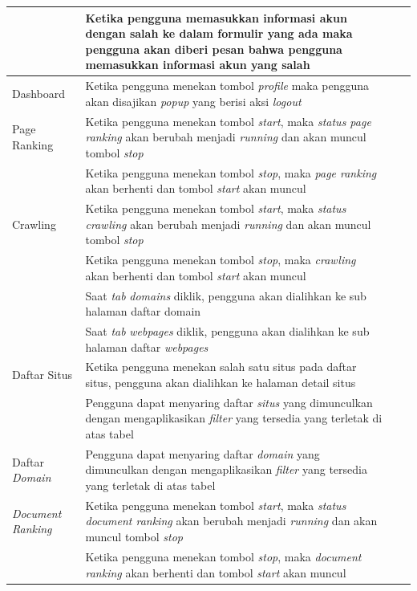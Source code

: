 \begin{longtable}{@{}|p{3cm}|p{6cm}|p{2.5cm}|p{2.5cm}|@{}}
	\cline{2-4}
	& Ketika pengguna memasukkan informasi akun dengan salah ke dalam formulir yang ada maka pengguna akan diberi pesan bahwa pengguna memasukkan informasi akun yang salah &\checkmark&\\	
	\hline
	Dashboard & Ketika pengguna menekan tombol \textit{profile} maka pengguna akan disajikan \textit{popup} yang berisi aksi \textit{logout} & \checkmark&\\
	\hline
	Page Ranking & Ketika pengguna menekan tombol \textit{start}, maka \textit{status page ranking} akan berubah menjadi \textit{running} dan akan muncul tombol \textit{stop} &\checkmark& \\
	\cline{2-4}	
	& Ketika pengguna menekan tombol \textit{stop}, maka \textit{page ranking} akan berhenti dan tombol \textit{start} akan muncul &\checkmark& \\
	\hline
	Crawling & Ketika pengguna menekan tombol \textit{start}, maka \textit{status crawling} akan berubah menjadi \textit{running} dan akan muncul tombol \textit{stop} &\checkmark&  \\
	\cline{2-4}
	& Ketika pengguna menekan tombol \textit{stop}, maka \textit{crawling} akan berhenti dan tombol \textit{start} akan muncul &\checkmark& \\
	\cline{2-4}
	& Saat \textit{tab} \textit{domains} diklik, pengguna akan dialihkan ke sub halaman daftar domain &\checkmark& \\
	\cline{2-4}
	& Saat \textit{tab} \textit{webpages} diklik, pengguna akan dialihkan ke sub halaman daftar \textit{webpages} &\checkmark& \\
	\hline
	Daftar Situs & Ketika pengguna menekan salah satu situs pada daftar situs, pengguna akan dialihkan ke halaman detail situs &\checkmark& \\
	\hline
	& Pengguna dapat menyaring daftar \textit{situs} yang dimunculkan dengan mengaplikasikan \textit{filter} yang tersedia yang terletak di atas tabel &\checkmark& \\
	Daftar \textit{Domain} & Pengguna dapat menyaring daftar \textit{domain} yang dimunculkan dengan mengaplikasikan \textit{filter} yang tersedia yang terletak di atas tabel &\checkmark& \\
	\cline{2-4}
	\textit{Document Ranking} & Ketika pengguna menekan tombol \textit{start}, maka \textit{status document ranking} akan berubah menjadi \textit{running} dan akan muncul tombol \textit{stop}&\checkmark&  \\
	\cline{2-4}
	& Ketika pengguna menekan tombol \textit{stop}, maka \textit{document ranking} akan berhenti dan tombol \textit{start} akan muncul &\checkmark& \\

\end{longtable}
